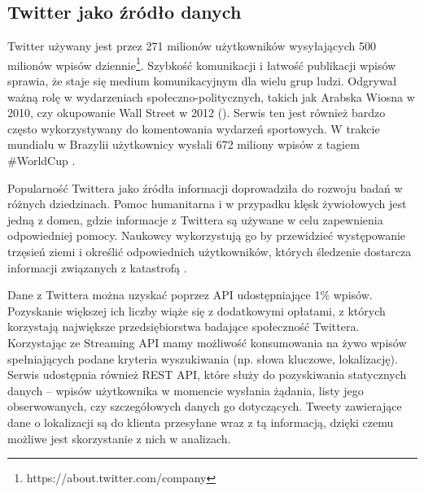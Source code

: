 \subsection{Twitter jako źródło danych}
Twitter używany jest przez 271 milionów użytkowników wysyłających 500 
milionów wpisów dziennie\footnote{https://about.twitter.com/company}.
Szybkość komunikacji i łatwość publikacji wpisów
sprawia, że staje się medium komunikacyjnym dla wielu grup ludzi.
Odgrywał ważną rolę w wydarzeniach społeczno-politycznych,
takich jak Arabska Wiosna w 2010, czy okupowanie Wall Street w 2012 
(\cite{TwitterDataAnalytics2013}).
Serwis ten jest również bardzo często wykorzystywany do komentowania wydarzeń
sportowych. W trakcie mundialu w Brazylii użytkownicy wysłali 672 miliony
wpisów z tagiem \#WorldCup \cite{TwitterStatsWorldCup}.

Popularność Twittera jako źródła informacji doprowadziła do rozwoju badań
w różnych dziedzinach. Pomoc humanitarna i w przypadku klęsk żywiołowych
jest jedną z domen, gdzie informacje z Twittera są używane w celu zapewnienia
odpowiedniej pomocy. Naukowcy wykorzystują go by przewidzieć występowanie trzęsień
ziemi i określić odpowiednich użytkowników, których śledzenie dostarcza informacji
związanych z katastrofą \cite{TwitterDataAnalytics2013}.

Dane z Twittera można uzyskać poprzez API udostępniające 1\% wpisów.
Pozyskanie większej ich liczby wiąże się z dodatkowymi opłatami, z których
korzystają największe przedsiębiorstwa badające społeczność Twittera.
Korzystając ze Streaming API mamy możliwość konsumowania na żywo
wpisów spełniających podane kryteria wyszukiwania (np. słowa kluczowe, lokalizację).
Serwis udostępnia również REST API, które służy do pozyskiwania statycznych danych
-- wpisów użytkownika w momencie wysłania żądania, listy jego obserwowanych,
czy szczegółowych danych go dotyczących. Tweety zawierające dane o lokalizacji
są do klienta przesyłane wraz z tą informacją, dzięki czemu możliwe jest
skorzystanie z nich w analizach.

